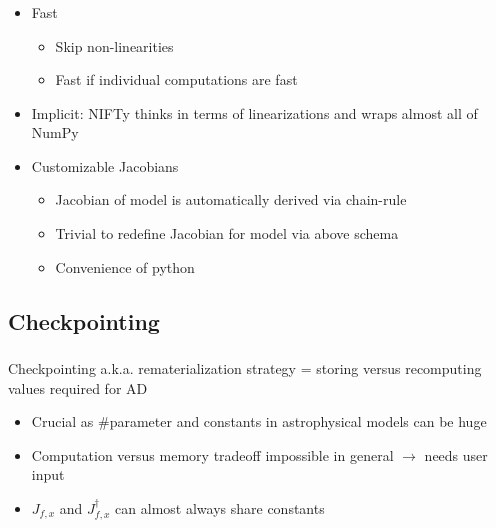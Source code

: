 \documentclass[aspectratio=169,xcolor=dvipsnames]{beamer}
\begin{document}
\begin{frame}
	\frametitle{\insertsection}
	\framesubtitle{\insertsubsection}

	\begin{itemize}
		\item Fast
		\begin{itemize}
			\item Skip non-linearities
			\item Fast if individual computations are fast
		\end{itemize}
		\pause
		\item Implicit: NIFTy thinks in terms of linearizations and wraps almost all of NumPy
		\pause
		\item Customizable Jacobians
		\begin{itemize}
			\item Jacobian of model is automatically derived via chain-rule
			\item Trivial to redefine Jacobian for model via above schema
			\item Convenience of python
		\end{itemize}
	\end{itemize}

\end{frame}

\subsection{Checkpointing}
\begin{frame}
	\frametitle{\insertsection}
	\framesubtitle{\insertsubsection}

	Checkpointing a.k.a. rematerialization strategy = storing versus recomputing values required for AD

	\begin{itemize}
		\item Crucial as \#parameter and constants in astrophysical models can be huge
		\item Computation versus memory tradeoff impossible in general $\rightarrow$ needs user input
		\item $J_{f,x}$ and $J_{f,x}^\dagger$ can almost always share constants
	\end{itemize}

\end{frame}
\end{document}
